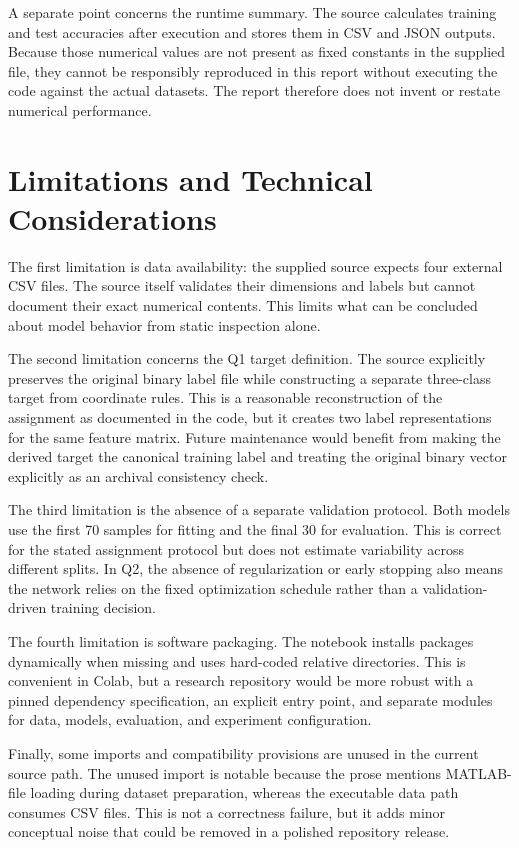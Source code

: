 \documentclass[11pt,a4paper]{article}
\newcommand{\code}[1]{\texttt{\detokenize{#1}}}
\begin{document}
A separate point concerns the runtime summary. The source calculates training and test accuracies after execution and stores them in CSV and JSON outputs. Because those numerical values are not present as fixed constants in the supplied file, they cannot be responsibly reproduced in this report without executing the code against the actual datasets. The report therefore does not invent or restate numerical performance.

\section{Limitations and Technical Considerations}
The first limitation is data availability: the supplied source expects four external CSV files. The source itself validates their dimensions and labels but cannot document their exact numerical contents. This limits what can be concluded about model behavior from static inspection alone.

The second limitation concerns the Q1 target definition. The source explicitly preserves the original binary label file while constructing a separate three-class target from coordinate rules. This is a reasonable reconstruction of the assignment as documented in the code, but it creates two label representations for the same feature matrix. Future maintenance would benefit from making the derived target the canonical training label and treating the original binary vector explicitly as an archival consistency check.

The third limitation is the absence of a separate validation protocol. Both models use the first 70 samples for fitting and the final 30 for evaluation. This is correct for the stated assignment protocol but does not estimate variability across different splits. In Q2, the absence of regularization or early stopping also means the network relies on the fixed optimization schedule rather than a validation-driven training decision.

The fourth limitation is software packaging. The notebook installs packages dynamically when missing and uses hard-coded relative directories. This is convenient in Colab, but a research repository would be more robust with a pinned dependency specification, an explicit entry point, and separate modules for data, models, evaluation, and experiment configuration.

Finally, some imports and compatibility provisions are unused in the current source path. The unused \code{loadmat} import is notable because the prose mentions MATLAB-file loading during dataset preparation, whereas the executable data path consumes CSV files. This is not a correctness failure, but it adds minor conceptual noise that could be removed in a polished repository release.
\end{document}
